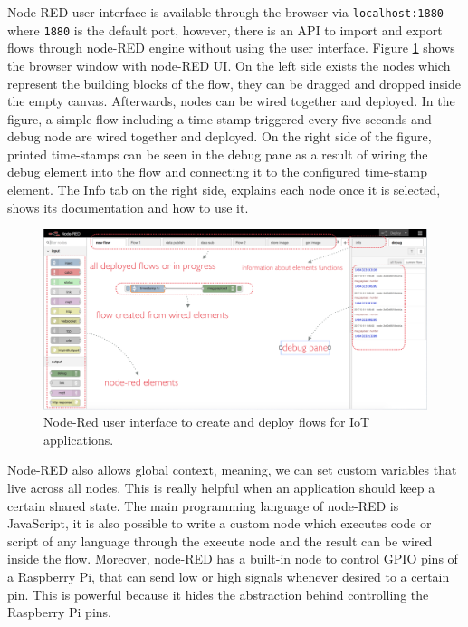 \noindent Node-RED user interface is available through the browser via \verb|localhost:1880| where \verb|1880| is the default port, however, there is an API to import and export flows through node-RED engine without using the user interface. Figure \ref{fig:node-red} shows the browser window with node-RED UI. On the left side exists the nodes which represent the building blocks of the flow, they can be dragged and dropped inside the empty canvas. Afterwards, nodes can be wired together and deployed. In the figure, a simple flow including a time-stamp triggered every five seconds and debug node are wired together and deployed. On the right side of the figure, printed time-stamps can be seen in the debug pane as a result of wiring the debug element into the flow and connecting it to the configured time-stamp element. The Info tab on the right side, explains each node once it is selected, shows its documentation and how to use it.


\begin{figure}[H]
	\centering
	\includegraphics[scale=0.5]{images/node-red.png}
	\caption{Node-Red user interface to create and deploy flows for IoT applications.}
	\label{fig:node-red}
\end{figure}


\noindent Node-RED also allows global context, meaning, we can set custom variables that live across all nodes. This is really helpful when  an application should keep a certain shared state. The main programming language of node-RED is JavaScript, it is also possible to write a custom node which executes code or script of any language through the execute node and the result can be  wired inside the flow. Moreover, node-RED has a built-in node to control GPIO pins of a Raspberry Pi, that can send low or high signals whenever desired to a certain pin. This is powerful because it hides the abstraction behind controlling the Raspberry Pi  pins.\\


